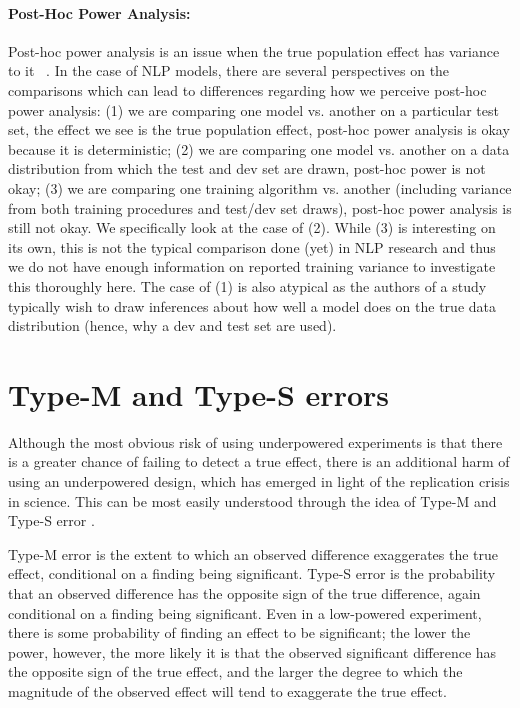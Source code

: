 \documentclass[11pt,a4paper]{article}
\begin{document}
\paragraph{Post-Hoc Power Analysis:}
Post-hoc power analysis is an issue when the true population effect has variance to it ~\citep{okeefeposthoc,theabuseofpower,gelman_dont_2019}. In the case of NLP models, there are several perspectives on the comparisons which can lead to differences regarding how we perceive post-hoc power analysis: (1) we are comparing one model vs. another on a particular test set, the effect we see is the true population effect, post-hoc power analysis is okay because it is deterministic; (2) we are comparing one model vs. another on a data distribution from which the test and dev set are drawn, post-hoc power is not okay; (3) we are comparing one training algorithm vs. another (including variance from both training procedures and test/dev set draws), post-hoc power analysis is still not okay. We specifically look at the case of (2). While (3) is interesting on its own, this is not the typical comparison done (yet) in NLP research and thus we do not have enough information on reported training variance to investigate this thoroughly here. The case of (1) is also atypical as the authors of a study typically wish to draw inferences about how well a model does on the true data distribution (hence, why a dev and test set are used). 


\section{Type-M and Type-S errors}
\label{app:typem}

Although the most obvious risk of using underpowered experiments is that there is a greater chance of failing to detect a true effect, there is an additional harm of using an underpowered design, which has emerged in light of the replication crisis in science. This can be most easily understood through the idea of Type-M and  Type-S error \citep{gelman2014beyond}.

Type-M error is the extent to which an observed difference exaggerates the true effect, conditional on a finding being significant. Type-S error is the probability that an observed difference has the opposite sign of the true difference, again conditional on a finding being significant. Even in a low-powered experiment, there is some probability of finding an effect to be significant; the lower the power, however, the more likely it is that the observed significant difference has the opposite sign of the true effect, and the larger the degree to which the magnitude of the observed effect will tend to exaggerate the true effect.
\end{document}
